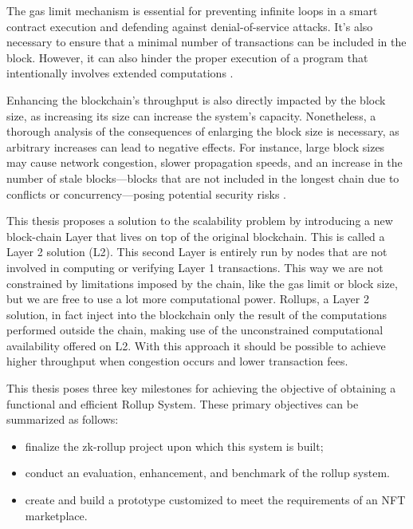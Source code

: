 The gas limit mechanism is essential for preventing infinite loops in a smart contract execution and defending against denial-of-service attacks. It's also necessary to ensure that a minimal number of transactions can be included in the block. However, it can also hinder the proper execution of a program that intentionally involves extended computations \cite{wood_ethereum_nodate}.

Enhancing the blockchain's throughput is also directly impacted by the block size, as increasing its size can increase the system's capacity. Nonetheless, a thorough analysis of the consequences of enlarging the block size is necessary, as arbitrary increases can lead to negative effects. For instance, large block sizes may cause network congestion, slower propagation speeds, and an increase in the number of stale blocks—blocks that are not included in the longest chain due to conflicts or concurrency—posing potential security risks \cite{gervais_security_2016}.

This thesis proposes a solution to the scalability problem by introducing a new block-chain Layer that lives on top of the original blockchain. This is called a Layer 2 solution (L2). This second Layer is entirely run by nodes that are not involved in computing or verifying Layer 1 transactions. This way we are not constrained by limitations imposed by the chain, like the gas limit or block size, but we are free to use a lot more computational power. Rollups, a Layer 2 solution, in fact inject into the blockchain only the result of the computations performed outside the chain, making use of the unconstrained computational availability offered on L2. With this approach it should be possible to achieve higher throughput when congestion occurs and lower transaction fees.

This thesis poses three key milestones for achieving the objective of obtaining a functional and efficient Rollup System. These primary objectives can be summarized as follows:
\begin{itemize}
    \vspace{-0.11in}
    \item finalize the zk-rollup project upon which this system is built;
          \vspace{-0.11in}
    \item conduct an evaluation, enhancement, and benchmark of the rollup system.
          \vspace{-0.11in}
    \item create and build a prototype customized to meet the requirements of an NFT marketplace.
\end{itemize}\

